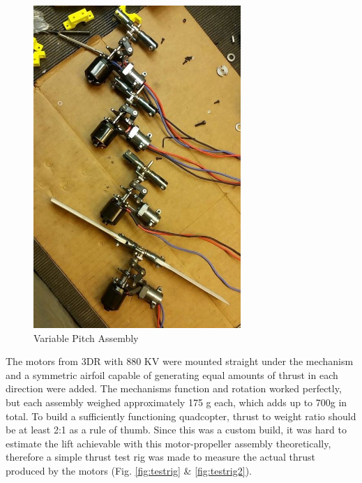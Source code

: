 \begin{figure}[h]
\begin{minipage}[b]{0.4\textwidth}
            \includegraphics[width = 0.7\textwidth]{VAPIQ-PICTURES/AfterAssemblyVPQ.jpg}
            \caption{Variable Pitch Assembly}
            \label{fig:after}
        \end{minipage}
\end{figure}

The motors from 3DR with 880 KV were mounted straight under the mechanism and a symmetric airfoil capable of generating equal amounts of thrust in each direction were added. The mechanisms function and rotation worked perfectly, but each assembly weighed approximately 175 g each, which adds up to 700g in total. To build a sufficiently functioning quadcopter, thrust to weight ratio should be at least 2:1 as a rule of thumb. Since this was a custom build, it was hard to estimate the lift achievable with this motor-propeller assembly theoretically, therefore a simple thrust test rig was made to measure the actual thrust produced by the motors (Fig. \ref{fig:testrig} \& \ref{fig:testrig2}). 

